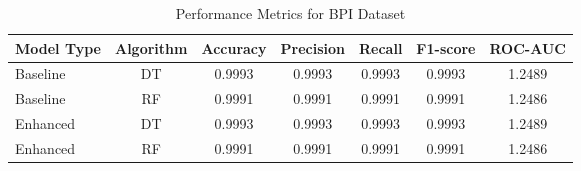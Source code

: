 \begin{table}[ht]
\centering
\caption{Performance Metrics for BPI Dataset}
\begin{tabular}{lcccccc}
\toprule
Model Type & Algorithm & Accuracy & Precision & Recall & F1-score & ROC-AUC \\
\midrule
Baseline & DT & 0.9993 & 0.9993 & 0.9993 & 0.9993 & 1.2489 \\
Baseline & RF & 0.9991 & 0.9991 & 0.9991 & 0.9991 & 1.2486 \\
Enhanced & DT & 0.9993 & 0.9993 & 0.9993 & 0.9993 & 1.2489 \\
Enhanced & RF & 0.9991 & 0.9991 & 0.9991 & 0.9991 & 1.2486 \\
\bottomrule
\end{tabular}
\label{tab:bpi_performance}
\end{table}
